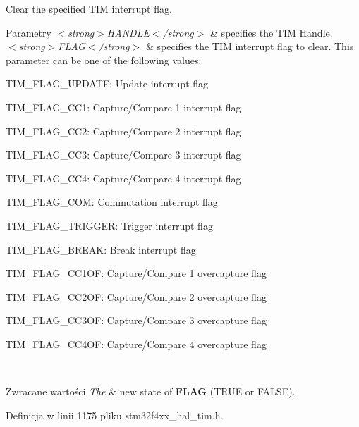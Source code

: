 Clear the specified T\+IM interrupt flag. 


\begin{DoxyParams}{Parametry}
{\em $<$strong$>$\+H\+A\+N\+D\+L\+E$<$/strong$>$} & specifies the T\+IM Handle. \\
\hline
{\em $<$strong$>$\+F\+L\+A\+G$<$/strong$>$} & specifies the T\+IM interrupt flag to clear. This parameter can be one of the following values\+: \begin{DoxyItemize}
\item T\+I\+M\+\_\+\+F\+L\+A\+G\+\_\+\+U\+P\+D\+A\+TE\+: Update interrupt flag \item T\+I\+M\+\_\+\+F\+L\+A\+G\+\_\+\+C\+C1\+: Capture/\+Compare 1 interrupt flag \item T\+I\+M\+\_\+\+F\+L\+A\+G\+\_\+\+C\+C2\+: Capture/\+Compare 2 interrupt flag \item T\+I\+M\+\_\+\+F\+L\+A\+G\+\_\+\+C\+C3\+: Capture/\+Compare 3 interrupt flag \item T\+I\+M\+\_\+\+F\+L\+A\+G\+\_\+\+C\+C4\+: Capture/\+Compare 4 interrupt flag \item T\+I\+M\+\_\+\+F\+L\+A\+G\+\_\+\+C\+OM\+: Commutation interrupt flag \item T\+I\+M\+\_\+\+F\+L\+A\+G\+\_\+\+T\+R\+I\+G\+G\+ER\+: Trigger interrupt flag \item T\+I\+M\+\_\+\+F\+L\+A\+G\+\_\+\+B\+R\+E\+AK\+: Break interrupt flag \item T\+I\+M\+\_\+\+F\+L\+A\+G\+\_\+\+C\+C1\+OF\+: Capture/\+Compare 1 overcapture flag \item T\+I\+M\+\_\+\+F\+L\+A\+G\+\_\+\+C\+C2\+OF\+: Capture/\+Compare 2 overcapture flag \item T\+I\+M\+\_\+\+F\+L\+A\+G\+\_\+\+C\+C3\+OF\+: Capture/\+Compare 3 overcapture flag \item T\+I\+M\+\_\+\+F\+L\+A\+G\+\_\+\+C\+C4\+OF\+: Capture/\+Compare 4 overcapture flag \end{DoxyItemize}
\\
\hline
\end{DoxyParams}

\begin{DoxyRetVals}{Zwracane wartości}
{\em The} & new state of {\bfseries F\+L\+AG} (T\+R\+UE or F\+A\+L\+SE). \\
\hline
\end{DoxyRetVals}


Definicja w linii 1175 pliku stm32f4xx\+\_\+hal\+\_\+tim.\+h.

\mbox{\label{group___t_i_m___exported___macros_gaea68155ce77e591e0c2582def061d6f0}} 
